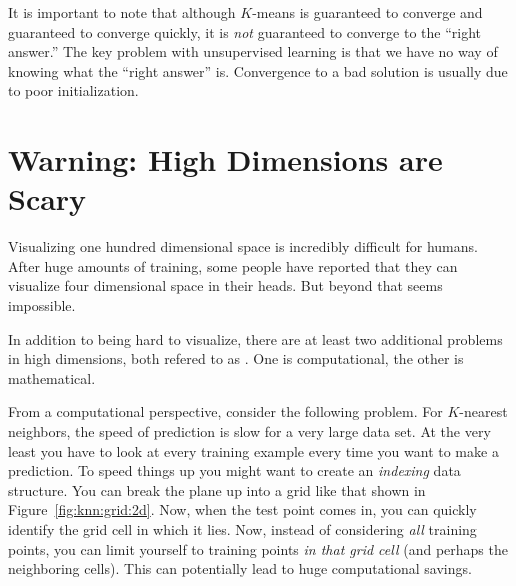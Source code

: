 
It is important to note that although $K$-means is guaranteed to
converge and guaranteed to converge quickly, it is \emph{not}
guaranteed to converge to the ``right answer.''  The key problem with
unsupervised learning is that we have no way of knowing what the
``right answer'' is.  Convergence to a bad solution is usually due to
poor initialization. 


\section{Warning: High Dimensions are Scary}

Visualizing one hundred dimensional space is incredibly difficult for
humans.  After huge amounts of training, some people have reported
that they can visualize four dimensional space in their heads.  But
beyond that seems impossible.

In addition to being hard to visualize, there are at least two
additional problems in high dimensions, both refered to as
.  One is computational, the
other is mathematical.


From a computational perspective, consider the following problem.
For $K$-nearest neighbors, the speed of prediction is slow for a very
large data set.  At the very least you have to look at every training
example every time you want to make a prediction.  To speed things up
you might want to create an \emph{indexing} data structure.  You can
break the plane up into a grid like that shown in
Figure~\ref{fig:knn:grid:2d}.  Now, when the test point comes in, you can
quickly identify the grid cell in which it lies.  Now, instead of
considering \emph{all} training points, you can limit yourself to
training points \emph{in that grid cell} (and perhaps the neighboring
cells).  This can potentially lead to huge computational savings.

